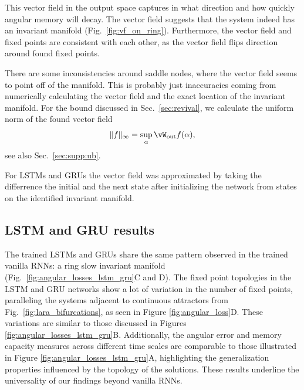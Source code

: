 \documentclass{article} %
\newcounter{ct}
\newcommand{\wout}{\vW_{\text{out}}}
\theoremstyle{definition}
\theoremstyle{remark}
\begin{document}
This vector field in the output space captures in what direction and how quickly angular memory will decay.
 The vector field  suggests that the system indeed has an invariant manifold (Fig.~\ref{fig:vf_on_ring}).
 Furthermore, the vector field and fixed points are consistent with each other, as the vector field flips direction around found fixed points.


 There are some inconsistencies around saddle nodes, where the vector field seems to point off of the manifold.
 This is probably just inaccuracies  coming from numerically calculating the vector field and the exact location of the invariant manifold.
For the bound discussed in Sec.~\ref{sec:revival}, we calculate the uniform norm of the found vector field 
\begin{equation}\|f\|_\infty = \sup_{\alpha} \wout f(\alpha),\end{equation} see also Sec.~\ref{sec:supp:ub}.

For LSTMs and GRUs the  vector field was approximated by taking the differrence the initial and the next state after initializing the network from states on the identified invariant manifold.



\newpage
\subsection{LSTM and GRU results}

The trained LSTMs and GRUs share the same pattern observed in the trained vanilla RNNs: a ring slow invariant manifold (Fig.~\ref{fig:angular_losses_lstm_gru}C and D).
The fixed point topologies in the LSTM and GRU networks show a lot of variation in the number of fixed points, paralleling the systems adjacent to continuous attractors from Fig.~\ref{fig:lara_bifurcations}, as seen in Figure \ref{fig:angular_loss}D. These variations are similar to those discussed in Figures \ref{fig:angular_losses_lstm_gru}B.
Additionally, the angular error and memory capacity measures across different time scales are comparable to those illustrated in Figure \ref{fig:angular_losses_lstm_gru}A, highlighting the generalization properties influenced by the topology of the solutions.
These results underline the universality of our findings beyond vanilla RNNs.
\end{document}
